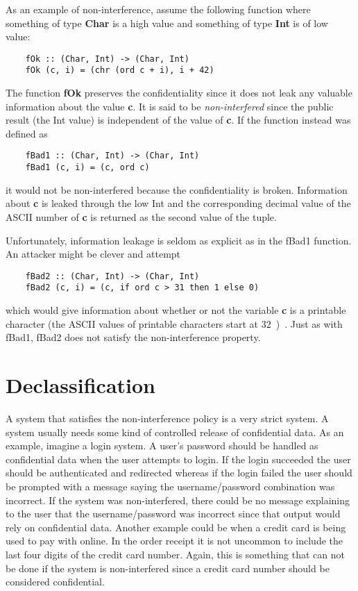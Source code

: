As an example of non-interference, assume the following function where something of type \textbf{Char} is a high value and something of type \textbf{Int} is of low value:
\begin{verbatim}
    fOk :: (Char, Int) -> (Char, Int)
    fOk (c, i) = (chr (ord c + i), i + 42)
\end{verbatim}
The function \textbf{fOk} preserves the confidentiality since it does not leak any valuable information about the value \textbf{c}. It is said to be \emph{non-interfered} since the public result (the Int value) is independent of the value of \textbf{c}. If the function instead was defined as
\begin{verbatim}
    fBad1 :: (Char, Int) -> (Char, Int)
    fBad1 (c, i) = (c, ord c)
\end{verbatim}
it would not be non-interfered because the confidentiality is broken. Information about \textbf{c} is leaked through the low Int and the corresponding decimal value of the ASCII number of \textbf{c} is returned as the second value of the tuple.

Unfortunately, information leakage is seldom as explicit as in the fBad1 function. An attacker might be clever and attempt
\begin{verbatim}
    fBad2 :: (Char, Int) -> (Char, Int)
    fBad2 (c, i) = (c, if ord c > 31 then 1 else 0)
\end{verbatim}
which would give information about whether or not the variable \textbf{c} is a printable character (the ASCII values of printable characters start at 32~\cite{ascii})~\cite{seclib}. Just as with fBad1, fBad2 does not satisfy the non-interference property.

\section{Declassification}
\label{chapter:declassification}
A system that satisfies the non-interference policy is a very strict system. A system usually needs some kind of controlled release of confidential data. As an example, imagine a login system. A user's password should be handled as confidential data when the user attempts to login. If the login succeeded the user should be authenticated and redirected whereas if the login failed the user should be prompted with a message saying the username/password combination was incorrect. If the system was non-interfered, there could be no message explaining to the user that the username/password was incorrect since that output would rely on confidential data. Another example could be when a credit card is being used to pay with online. In the order receipt it is not uncommon to include the last four digits of the credit card number. Again, this is something that can not be done if the system is non-interfered since a credit card number should be considered confidential.

